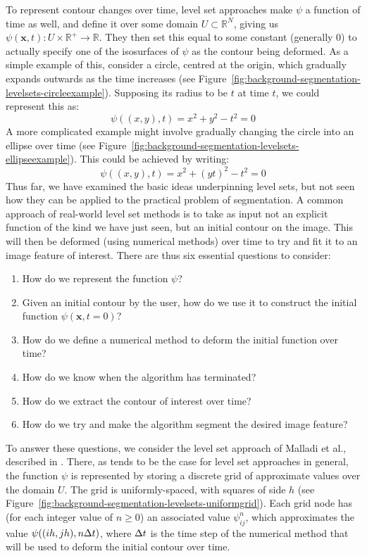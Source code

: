 To represent contour changes over time, level set approaches make $\psi$ a function of time as well, and define it over some domain $U \subset \mathbb{R}^N$, giving us $\psi(\mathbf{x}, t) : U \times \mathbb{R}^+ \rightarrow \mathbb{R}$. They then set this equal to some constant (generally $0$) to actually specify one of the isosurfaces of $\psi$ as the contour being deformed. As a simple example of this, consider a circle, centred at the origin, which gradually expands outwards as the time increases (see Figure~\ref{fig:background-segmentation-levelsets-circleexample}). Supposing its radius to be $t$ at time $t$, we could represent this as:
%
\[
\psi((x,y),t) = x^2 + y^2 - t^2 = 0
\]
%
A more complicated example might involve gradually changing the circle into an ellipse over time (see Figure~\ref{fig:background-segmentation-levelsets-ellipseexample}). This could be achieved by writing:
%
\[
\psi((x,y),t) = x^2 + (yt)^2 - t^2 = 0
\]
%
Thus far, we have examined the basic ideas underpinning level sets, but not seen how they can be applied to the practical problem of segmentation. A common approach of real-world level set methods is to take as input not an explicit function of the kind we have just seen, but an initial contour on the image. This will then be deformed (using numerical methods) over time to try and fit it to an image feature of interest. There are thus six essential questions to consider:

\begin{enumerate}

\item How do we represent the function $\psi$?

\item Given an initial contour by the user, how do we use it to construct the initial function $\psi(\mathbf{x}, t = 0)$?

\item How do we define a numerical method to deform the initial function over time?

\item How do we know when the algorithm has terminated?

\item How do we extract the contour of interest over time?

\item How do we try and make the algorithm segment the desired image feature?

\end{enumerate}

\noindent To answer these questions, we consider the level set approach of Malladi et al., described in \cite{malladi95}. There, as tends to be the case for level set approaches in general, the function $\psi$ is represented by storing a discrete grid of approximate values over the domain $U$. The grid is uniformly-spaced, with squares of side $h$ (see Figure~\ref{fig:background-segmentation-levelsets-uniformgrid}). Each grid node has (for each integer value of $n \ge 0$) an associated value $\psi_{ij}^n$, which approximates the value $\psi((ih,jh),n\Delta t)$, where $\Delta t$ is the time step of the numerical method that will be used to deform the initial contour over time.

